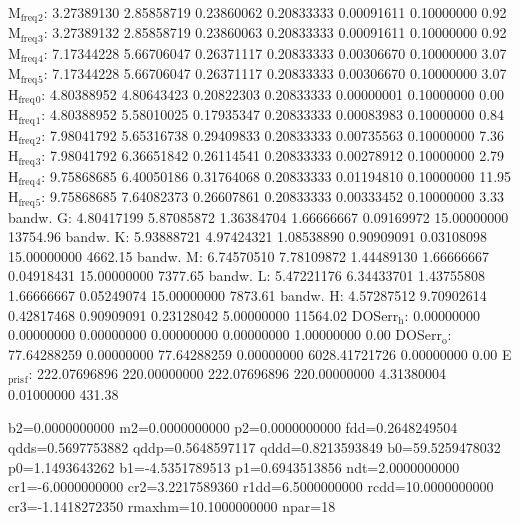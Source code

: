 \documentclass[11pt]{article}
\begin{document}
M\(_{\text{freq}}\)\(_{\text{2}}\):   3.27389130   2.85858719   0.23860062   0.20833333   0.00091611   0.10000000         0.92
M\(_{\text{freq}}\)\(_{\text{3}}\):   3.27389132   2.85858719   0.23860063   0.20833333   0.00091611   0.10000000         0.92
M\(_{\text{freq}}\)\(_{\text{4}}\):   7.17344228   5.66706047   0.26371117   0.20833333   0.00306670   0.10000000         3.07
M\(_{\text{freq}}\)\(_{\text{5}}\):   7.17344228   5.66706047   0.26371117   0.20833333   0.00306670   0.10000000         3.07
H\(_{\text{freq}}\)\(_{\text{0}}\):   4.80388952   4.80643423   0.20822303   0.20833333   0.00000001   0.10000000         0.00
H\(_{\text{freq}}\)\(_{\text{1}}\):   4.80388952   5.58010025   0.17935347   0.20833333   0.00083983   0.10000000         0.84
H\(_{\text{freq}}\)\(_{\text{2}}\):   7.98041792   5.65316738   0.29409833   0.20833333   0.00735563   0.10000000         7.36
H\(_{\text{freq}}\)\(_{\text{3}}\):   7.98041792   6.36651842   0.26114541   0.20833333   0.00278912   0.10000000         2.79
H\(_{\text{freq}}\)\(_{\text{4}}\):   9.75868685   6.40050186   0.31764068   0.20833333   0.01194810   0.10000000        11.95
H\(_{\text{freq}}\)\(_{\text{5}}\):   9.75868685   7.64082373   0.26607861   0.20833333   0.00333452   0.10000000         3.33
bandw. G:   4.80417199   5.87085872   1.36384704   1.66666667   0.09169972  15.00000000     13754.96
bandw. K:   5.93888721   4.97424321   1.08538890   0.90909091   0.03108098  15.00000000      4662.15
bandw. M:   6.74570510   7.78109872   1.44489130   1.66666667   0.04918431  15.00000000      7377.65
bandw. L:   5.47221176   6.34433701   1.43755808   1.66666667   0.05249074  15.00000000      7873.61
bandw. H:   4.57287512   9.70902614   0.42817468   0.90909091   0.23128042   5.00000000     11564.02
DOSerr\(_{\text{h}}\):   0.00000000   0.00000000   0.00000000   0.00000000   0.00000000   1.00000000         0.00
DOSerr\(_{\text{o}}\):  77.64288259   0.00000000  77.64288259   0.00000000 6028.41721726   0.00000000         0.00
E\(_{\text{pris}}\)\(_{\text{f}}\): 222.07696896 220.00000000 222.07696896 220.00000000   4.31380004   0.01000000       431.38

b2=0.0000000000 m2=0.0000000000 p2=0.0000000000 fdd=0.2648249504 qdds=0.5697753882 qddp=0.5648597117 qddd=0.8213593849 b0=59.5259478032 p0=1.1493643262 b1=-4.5351789513 p1=0.6943513856 ndt=2.0000000000 cr1=-6.0000000000 cr2=3.2217589360 r1dd=6.5000000000 rcdd=10.0000000000 cr3=-1.1418272350 rmaxhm=10.1000000000 npar=18 
\end{document}
